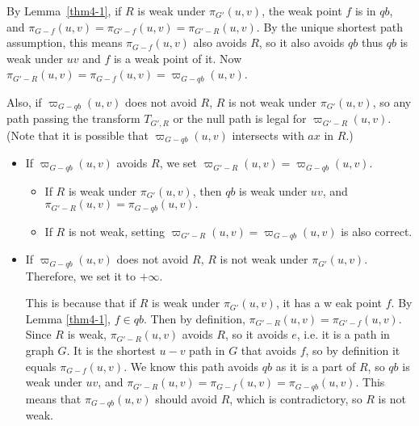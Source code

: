 \documentclass[11pt]{article}
\theoremstyle{plain}
\theoremstyle{definition}
\newcommand{\new}[1]{\pi_{G'}(#1)}
\newcommand{\og}[3]{\pi_{G-#3}\left(#1,#2\right)}
\newcommand{\nng}[3]{\pi_{G'-#3}\left(#1,#2\right)}
\newcommand{\odg}[3]{\varpi_{G-#3}\left(#1,#2\right)}
\newcommand{\ndg}[3]{\varpi_{G'-#3}\left(#1,#2\right)}
\begin{document}
By Lemma~\ref{thm4-1}, if $R$ is weak under $\new{u, v}$, the weak point $f$ is in $qb$, and $\og{u}{v}{f}=\nng{u}{v}{f}=\nng{u}{v}{R}$. By the unique shortest path assumption, this means $\og{u}{v}{f}$ also avoids $R$, so it also avoids $qb$  thus $qb$ is weak under $uv$ and $f$ is a weak point of it. Now $\nng{u}{v}{R}=\og{u}{v}{f}=\odg{u}{v}{qb}$.

Also, if $\odg{u}{v}{qb}$ does not avoid $R$, $R$ is not weak under $\new{u, v}$, so any path passing the transform $T_{G',R}$ or the null path is legal for $\ndg{u}{v}{R}$. (Note that it is possible that $\odg{u}{v}{qb}$ intersects with $ax$ in $R$.)

\iffalse
\begin{itemize}

    \item If $\odg{u}{v}{qb} $ avoids $R$, we set $\ndg{u}{v}{R}=\odg{u}{v}{qb}.$   
    \vspace{5pt}

    \begin{itemize}
        \item If $R$ is weak under $\new{u, v}$, then $qb$ is weak under $uv$, and $\nng{u}{v}{R}=\og{u}{v}{qb}.$
        \vspace{5pt}
        


        
        \vspace{5pt}
        \item If $R$ is not weak, setting $\ndg{u}{v}{R}=\odg{u}{v}{qb}$ is also correct.
    \end{itemize}
    \vspace{5pt}
    \item If $\odg{u}{v}{qb} $ does not avoid $R$, $R$ is not weak under $\new{u, v}.$ Therefore, we set it to $+\infty.$
    \vspace{5pt}
    
    This is because that if $R$ is weak under $\new{u, v}$, it has a w eak point $f.$ By Lemma \ref{thm4-1}, $f\in qb.$ Then by definition, $\nng{u}{v}{R}=\nng{u}{v}{f}.$ Since $R$ is weak, $\nng{u}{v}{R}$ avoids $R$, so it avoids $e$, i.e. it is a path in graph $G.$ It is the shortest $u-v$ path in $G$ that avoids $f$, so by definition it equals $\og{u}{v}{f}.$ We know this path avoids $qb$ as it is a part of $R$, so $qb$ is weak under $uv$, and $\nng{u}{v}{R}=\og{u}{v}{f}=\og{u}{v}{qb}.$ This means that $\og{u}{v}{qb}$ should avoid $R$, which is contradictory, so $R$ is not weak.


\end{itemize}
\end{document}
